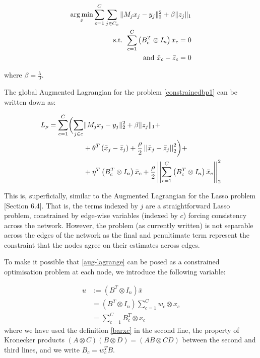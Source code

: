 \begin{align}
\operatorname*{arg\,min}_{\bar{x}} \sum_{c=1}^C \sum_{j \in C_c} \|M_jx_j - y_j\|_2^2 + \beta\|z_j\|_1
\nonumber \\
\text{ s.t. } \sum_{c=1}^C\left(B_c^T \otimes I_n\right)\bar{x}_c = 0 \nonumber \\
\text{ and } \bar{x}_c - \bar{z}_c = 0
\label{constrainedbp1}
\end{align}

where \(\beta = \frac{\lambda}{J}\).

The global Augmented Lagrangian \cite{Boyd2010a}
 for the problem \eqref{constrainedbp1} can be written down as:

\begin{align}
L_\rho = \sum_{c=1}^C  \biggl( \sum_{j \in c} & \|M_jx_j - y_j\|_2^2 + \beta\|z_j\|_1  + \nonumber \\ & + \theta^T\left(\bar{x}_j - \bar{z}_j\right)  +  \frac{\rho}{2}\left|\left|\bar{x}_j-\bar{z}_j\right|\right|_2^2 \biggr) + \nonumber \\  & + \eta^T\left(B_c^T \otimes I_n\right)\bar{x}_c + \frac{\rho}{2}\left|\left|\sum_{c=1}^C\left(B_c^T \otimes I_n\right)\bar{x}_c\right|\right|_2^2
\label{aug-lagrange}
\end{align}

This is, superficially, similar to the Augmented Lagrangian for the Lasso problem \cite{Boyd2010a}[Section 6.4]. That is, the terms indexed by \(j\) are a straightforward Lasso problem, constrained by edge-wise variables (indexed by \(c\)) forcing consistency across the network. However, the problem (as currently written) is not separable across the edges of the network as the final and penultimate term represent the constraint that the nodes agree on their estimates across edges. 

To make it possible that \ref{aug-lagrange} can be posed  as a constrained optimisation problem at each node, we introduce the following variable:

\begin{defn}
\begin{align*}
u &:= \left(B^T \otimes I_n\right)\bar{x} \\
& = \left(B^T \otimes I_n\right)\sum_{c=1}^C w_c \otimes x_c \\
& = \sum	_{c=1}^C B_c^T\otimes x_c
\end{align*}
where we have used the definition \eqref{barxc} in the second line, the property of Kronecker products \((A\otimes C)(B \otimes D) = (AB \otimes CD)\) between the second and third lines, and we write \(B_c = w_c^TB\).
\end{defn}

